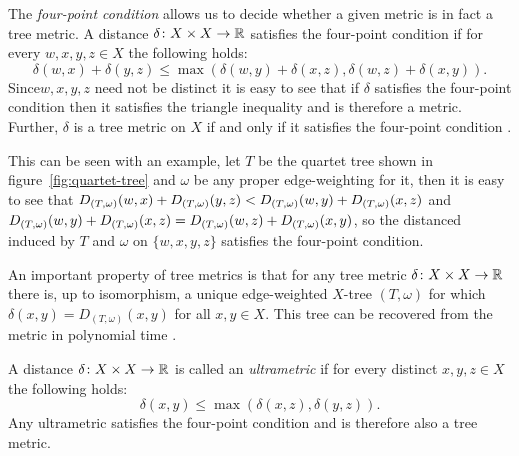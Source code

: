 The \textit{four-point condition} allows us to decide whether a given metric
is in fact a tree metric.  A distance $\delta \colon X \times X \to {\mathbb R}$
satisfies the four-point condition if for every $w,x,y,z \in X$ the following
holds:
\begin{equation*}
  \delta(w,x) + \delta(y,z) \leq \max(\delta(w,y)+\delta(x,z),
                                      \delta(w,z)+\delta(x,y)).
\end{equation*}
Since$w,x,y,z$ need not be distinct it is easy to see that if $\delta$
satisfies the four-point condition then it satisfies the triangle inequality
and is therefore a metric.  Further, $\delta$ is a tree metric on $X$ if and
only if it satisfies the four-point condition \citep{semple2003phylogenetics}.

This can be seen with an example, let $T$ be the quartet tree shown in
figure~\ref{fig:quartet-tree} and $\omega$ be any proper edge-weighting for
it, then it is easy to see that $D_{(T,\omega)}(w,x)+D_{(T,\omega)}(y,z) < D_{(T,\omega)}(w,y)+D_{(T,\omega)}(x,z)$
and $D_{(T,\omega)}(w,y)+D_{(T,\omega)}(x,z) = D_{(T,\omega)}(w,z)+D_{(T,\omega)}(x,y)$, so the distanced induced by
$T$ and $\omega$ on $\{w,x,y,z\}$ satisfies the four-point condition.

An important property of tree metrics is that for any tree metric $\delta
\colon X \times X \to {\mathbb R}$ there is, up to isomorphism, a unique edge-weighted
$X$-tree $(T,\omega)$ for which $\delta(x,y) = D_{(T,\omega)}(x,y)$ for all
$x,y \in X$.  This tree can be recovered from the metric in polynomial time
\citep{semple2003phylogenetics}.

A distance $\delta \colon X \times X \to {\mathbb R}$ is called an
\textit{ultrametric} if for every distinct $x,y,z \in X$ the following holds:
\begin{equation*}
  \delta(x,y) \leq \max(\delta(x,z),\delta(y,z)).
\end{equation*}
Any ultrametric satisfies the four-point condition and is therefore also a
tree metric.

